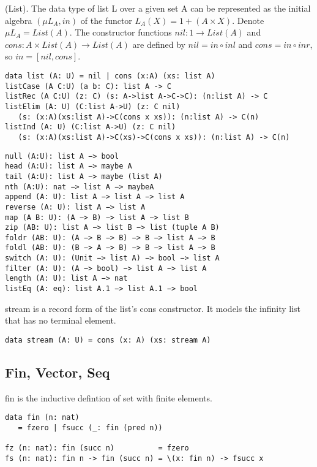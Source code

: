 \begin{definition} (List).
The data type of list L over a given set A can be represented
as the initial algebra $(\mu L_A, in)$ of the functor $L_A(X) = 1 + (A × X)$.
Denote $\mu L_A = List(A)$. The constructor functions
$nil: 1 \rightarrow List(A)$ and $cons: A \times List(A) \rightarrow
List(A)$ are defined by $nil = in \circ inl$ and $cons = in \circ inr$,
so $in = [nil,cons]$.
\begin{lstlisting}
data list (A: U) = nil | cons (x:A) (xs: list A)
listCase (A C:U) (a b: C): list A -> C
listRec (A C:U) (z: C) (s: A->list A->C->C): (n:list A) -> C
listElim (A: U) (C:list A->U) (z: C nil)
   (s: (x:A)(xs:list A)->C(cons x xs)): (n:list A) -> C(n)
listInd (A: U) (C:list A->U) (z: C nil)
   (s: (x:A)(xs:list A)->C(xs)->C(cons x xs)): (n:list A) -> C(n)
\end{lstlisting}
\begin{lstlisting}
null (A:U): list A −> bool
head (A:U): list A −> maybe A
tail (A:U): list A −> maybe (list A)
nth (A:U): nat −> list A −> maybeA
append (A: U): list A −> list A −> list A
reverse (A: U): list A −> list A
map (A B: U): (A −> B) −> list A −> list B
zip (AB: U): list A −> list B −> list (tuple A B)
foldr (AB: U): (A −> B −> B) −> B −> list A −> B
foldl (AB: U): (B −> A −> B) −> B −> list A −> B
switch (A: U): (Unit −> list A) −> bool −> list A
filter (A: U): (A −> bool) −> list A −> list A
length (A: U): list A −> nat
listEq (A: eq): list A.1 −> list A.1 −> bool
\end{lstlisting}
\end{definition}

stream is a record form of the list's cons constructor. It models the infinity list that has no terminal element.
\begin{lstlisting}
data stream (A: U) = cons (x: A) (xs: stream A)
\end{lstlisting}

\subsection{Fin, Vector, Seq}

fin is the inductive defintion of set with finite elements.
\begin{lstlisting}
data fin (n: nat)
   = fzero | fsucc (_: fin (pred n))

fz (n: nat): fin (succ n)          = fzero
fs (n: nat): fin n -> fin (succ n) = \(x: fin n) -> fsucc x
\end{lstlisting}

